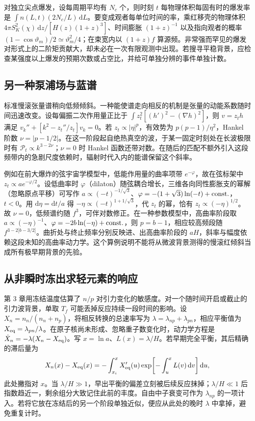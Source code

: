 对独立尖点爆发，设每周期平均有 $N_c$ 个，则时刻 $t$ 每物理体积每固有时的爆发率是 $\int n(L,t)(2N_c/L)\,\mathrm dL$。要变成观者每单位时间的率，乘红移壳的物理体积 $4\pi S_K^2(\chi)\,\mathrm dz/[H(z)(1+z)^3]$、时间膨胀 $(1+z)^{-1}$ 以及指向观者的概率 $(1-\cos\vartheta_m)/2\simeq\vartheta_m^2/4$；在束宽内以 $(1+z)f$ 算源频。非常强而罕见的爆发对形式上的二阶矩贡献大，却未必在一次有限观测中出现。若搜寻平稳背景，应检查某强度以上爆发的预期次数或占空比，并给可单独分辨的事件单独计数。

\subsection{另一种泵浦场与蓝谱}

标准慢滚张量谱稍向低频倾斜。一种能使谱走向相反的机制是张量的动能系数随时间迅速改变。设每偏振二次作用量正比于 $\int z_t^2[(h')^2-(\nabla h)^2]$，则 $v=z_th$ 满足 $v_k''+[k^2-z_t''/z_t]v_k=0$。若 $z_t\propto|\eta|^p$，有效势为 $p(p-1)/\eta^2$，Hankel 阶数 $\nu=|p-1/2|$。在这一阶段起自绝热真空的波，于某一固定时刻处在长波极限时有 $\mathcal P_t\propto k^{3-2\nu}$；$\nu=0$ 时 Hankel 函数还带对数。在随后的匹配不额外引入这段频带内的急剧尺度依赖时，辐射时代入内的能谱保留这个斜率。

例如在前大爆炸的弦宇宙学模型中，低能作用量的曲率项带 $e^{-\varphi}$，故在弦标架中 $z_t\propto a e^{-\varphi/2}$。设低曲率时 $\varphi$（dilaton）随弦耦合增长，三维各向同性膨胀支的幂解（忽略原点平移）可写作 $a\propto(-t)^{-1/\sqrt3}$、$\varphi=-(1+\sqrt3)\ln(-t)+{\rm const.}$，$t<0$。用 $\mathrm d\eta=\mathrm dt/a$ 得 $-\eta\propto(-t)^{1+1/\sqrt3}$，代 $z_t$ 的幂，恰有 $z_t\propto(-\eta)^{1/2}$。故 $\nu=0$，低频谱约随 $f^3$，可伴对数修正。在一种参数模型中，高曲率阶段取 $a\propto(-\eta)^{-1}$、$\varphi=-2b\ln(-\eta)+{\rm const.}$，则 $p=b-1$，相应较高频段随 $f^{3-2|b-3/2|}$。曲折处与终止频率分别反映进、出高曲率阶段的 $aH$，斜率与幅度依赖这段未知的高曲率动力学。这个算例说明不能将从微波背景测得的慢滚红倾斜当成所有极早期背景的先验。


\subsection{从非瞬时冻出求轻元素的响应}

第 3 章用冻结温度估算了 $n/p$ 对引力变化的敏感度。对一个随时间开启或截止的引力波背景，单取 $T_f$ 可能丢掉反应持续一段时间的影响。设 $X_n=n_n/(n_n+n_p)$，将相反转换的总速率写为 $\lambda=\lambda_{np}+\lambda_{pn}$，相应平衡值为 $X_{\rm eq}=\lambda_{pn}/\lambda$。在原子核尚未形成、忽略重子数变化时，动力学方程是 $\dot X_n=-\lambda(X_n-X_{\rm eq})$。写 $x=\ln a$、$L(x)=\lambda/H$。若早期完全平衡，其后精确的滞后量为
\[
 X_n(x)-X_{\rm eq}(x)=-\int_{x_i}^{x}
 X_{\rm eq}'(u)\exp\!\left[-\int_u^x L(v)\,\mathrm dv\right]\mathrm du ,
\]
此处撇指对 $x$。当 $\lambda/H\gg1$，早出平衡的偏差立刻被后续反应抹掉；$\lambda/H\ll1$ 后指数趋近一，剩余组分大致记住此前的丰度。自由中子衰变可作为 $\lambda_{np}$ 的一项计入。若将它放在冻结后的另一个阶段单独近似，便应从此处的晚时 $\lambda$ 中拿掉，避免重复计时。

